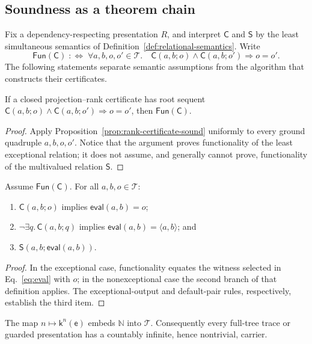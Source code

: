 \documentclass[runningheads]{llncs}
\newcommand{\Tree}{\mathcal{T}}
\newcommand{\Code}{\mathsf{C}}
\newcommand{\Step}{\mathsf{S}}
\newcommand{\evalop}{\mathsf{eval}}
\newcommand{\pair}[2]{\langle #1,#2\rangle}
\begin{document}
\subsection{Soundness as a theorem chain}

Fix a dependency-respecting presentation $R$, and interpret $\Code$ and
$\Step$ by the least simultaneous semantics of
Definition~\ref{def:relational-semantics}.  Write
\[
 \mathsf{Fun}(\Code)\;:\!\!\Longleftrightarrow\;
 \forall a,b,o,o'\in\Tree.\quad
 \Code(a,b;o)\wedge\Code(a,b;o')\Longrightarrow o=o'.
\]
The following statements separate semantic assumptions from the algorithm
that constructs their certificates.

\begin{lemma}
\label{lem:code-functional}
If a closed projection--rank certificate has root sequent
$\Code(a,b;o)\wedge\Code(a,b;o')\Rightarrow o=o'$, then
$\mathsf{Fun}(\Code)$.
\end{lemma}

\begin{proof}
Apply Proposition~\ref{prop:rank-certificate-sound} uniformly to every ground
quadruple $a,b,o,o'$.  Notice that the argument proves functionality of the
least exceptional relation; it does not assume, and generally cannot prove,
functionality of the multivalued relation $\Step$.
\end{proof}

\begin{lemma}
\label{lem:eval-laws}
Assume $\mathsf{Fun}(\Code)$.  For all $a,b,o\in\Tree$:
\begin{enumerate}
  \item $\Code(a,b;o)$ implies $\evalop(a,b)=o$;
  \item $\neg\exists q.\,\Code(a,b;q)$ implies
        $\evalop(a,b)=\pair{a}{b}$; and
  \item $\Step(a,b;\evalop(a,b))$.
\end{enumerate}
\end{lemma}

\begin{proof}
In the exceptional case, functionality equates the witness selected in
Eq.~\eqref{eq:eval} with $o$; in the nonexceptional case the second branch of
that definition applies.  The exceptional-output and default-pair rules,
respectively, establish the third item.
\end{proof}

\begin{lemma}
\label{lem:carrier-infinite}
The map $n\mapsto\mathsf k^n(\mathsf e)$ embeds $\mathbb N$ into $\Tree$.
Consequently every full-tree trace or guarded presentation has a countably
infinite, hence nontrivial, carrier.
\end{lemma}
\end{document}
